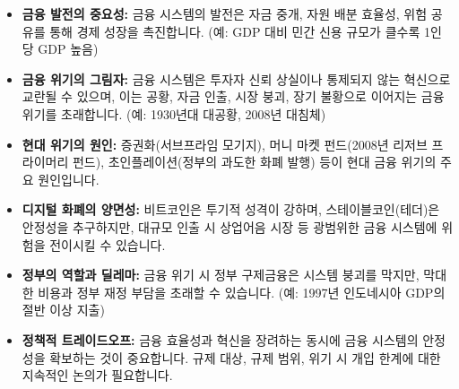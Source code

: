 \documentclass[11pt,a4paper]{article}
\begin{document}
\newpage

\begin{tcolorbox}[title=\textbf{빠르게 훑어보기: Module 1 핵심 요약}]
\begin{itemize}
    \item \textbf{금융 발전의 중요성:} 금융 시스템의 발전은 자금 중개, 자원 배분 효율성, 위험 공유를 통해 경제 성장을 촉진합니다. (예: GDP 대비 민간 신용 규모가 클수록 1인당 GDP 높음)
    \item \textbf{금융 위기의 그림자:} 금융 시스템은 투자자 신뢰 상실이나 통제되지 않는 혁신으로 교란될 수 있으며, 이는 공황, 자금 인출, 시장 붕괴, 장기 불황으로 이어지는 금융 위기를 초래합니다. (예: 1930년대 대공황, 2008년 대침체)
    \item \textbf{현대 위기의 원인:} 증권화(서브프라임 모기지), 머니 마켓 펀드(2008년 리저브 프라이머리 펀드), 초인플레이션(정부의 과도한 화폐 발행) 등이 현대 금융 위기의 주요 원인입니다.
    \item \textbf{디지털 화폐의 양면성:} 비트코인은 투기적 성격이 강하며, 스테이블코인(테더)은 안정성을 추구하지만, 대규모 인출 시 상업어음 시장 등 광범위한 금융 시스템에 위험을 전이시킬 수 있습니다.
    \item \textbf{정부의 역할과 딜레마:} 금융 위기 시 정부 구제금융은 시스템 붕괴를 막지만, 막대한 비용과 정부 재정 부담을 초래할 수 있습니다. (예: 1997년 인도네시아 GDP의 절반 이상 지출)
    \item \textbf{정책적 트레이드오프:} 금융 효율성과 혁신을 장려하는 동시에 금융 시스템의 안정성을 확보하는 것이 중요합니다. 규제 대상, 규제 범위, 위기 시 개입 한계에 대한 지속적인 논의가 필요합니다.
\end{itemize}
\end{tcolorbox}
\end{document}
